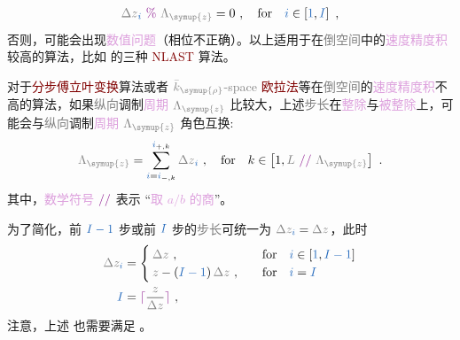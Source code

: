 \begin{align} \label{eq:iterate-mod-Tz}
	{\mathcolor{gray}{\Delta z}}_{\textcolor{NavyBlue}{i}} ~\textcolor{Plum}{\%}~ \mathcolor{gray}{\Lambda_{\symup{z}}} = 0 ~, \ \ \ \text{for} \ \ \ \textcolor{NavyBlue}{i} \in \left[ \textcolor{NavyBlue}{1}, \textcolor{NavyBlue}{I} \right] ~,
\end{align}
否则，可能会出现\textcolor{Plum}{数值问题}（相位不正确）。以上适用于在\textcolor{gray}{倒空间}中的\textcolor{Plum}{速度精度积}较高的算法，比如  的三种 \textcolor{Maroon}{NLAST} 算法。

对于\textcolor{Maroon}{分步傅立叶变换}算法或者 $\mathcolor{gray}{\bar{k}_{\symup{\rho}}}$\textcolor{gray}{-space} \textcolor{Maroon}{欧拉法}等在\textcolor{gray}{倒空间}的\textcolor{Plum}{速度精度积}不高的算法，如果\textcolor{gray}{纵向}\textcolor{NavyBlue}{调制}\textcolor{Plum}{周期} $\mathcolor{gray}{\Lambda_{\symup{z}}}$ 比较大，上述\textcolor{gray}{步长}在\textcolor{Plum}{整除}与\textcolor{Plum}{被整除}上，可能会与\textcolor{gray}{纵向}\textcolor{NavyBlue}{调制}\textcolor{Plum}{周期} $\mathcolor{gray}{\Lambda_{\symup{z}}}$ 角色互换:
\begin{align} \label{eq:iterate-Tz-mod}
	\mathcolor{gray}{\Lambda_{\symup{z}}} = \sum^{\textcolor{NavyBlue}{i}_{+,k}}_{\textcolor{NavyBlue}{i}=\textcolor{NavyBlue}{i}_{-,k}} {\mathcolor{gray}{\Delta z}}_{\textcolor{NavyBlue}{i}} ~, \ \ \ \text{for} \ \ \ k \in \left[ 1, \mathcolor{gray}{L} ~\textcolor{Plum}{//}~ \mathcolor{gray}{\Lambda_{\symup{z}}} \right] ~.
\end{align}
其中，\textcolor{Plum}{数学符号} $\textcolor{Plum}{//}$ 表示 “\textcolor{Plum}{取 $a/b$ 的商}”。

为了简化，前 $\textcolor{NavyBlue}{I-1}$ 步或前 $\textcolor{NavyBlue}{I}$ 步的\textcolor{gray}{步长}可统一为 $\mathcolor{gray}{\Delta z}_{\textcolor{NavyBlue}{i}} = \mathcolor{gray}{\Delta z}$，此时
\begin{subequations} \label{eq:iterate-step}
	\begin{align}
		\mathcolor{gray}{\Delta z}_{\textcolor{NavyBlue}{i}} &= \begin{cases}
			\mathcolor{gray}{\Delta z} ~, &\quad \text{for} \ \ \ \textcolor{NavyBlue}{i} \in \left[ \textcolor{NavyBlue}{1}, \textcolor{NavyBlue}{I-1} \right]\\
			\mathcolor{gray}{z} - \left( \textcolor{NavyBlue}{I-1} \right) \mathcolor{gray}{\Delta z} ~, &\quad \text{for} \ \ \ \textcolor{NavyBlue}{i} = \textcolor{NavyBlue}{I} \\
		\end{cases} \label{eq:iterate-step-a} \\ \textcolor{NavyBlue}{I} &= \textcolor{Plum}{\lceil \textcolor{black}{\frac{\mathcolor{gray}{z}}{\mathcolor{gray}{\Delta z}}} \rceil} \label{eq:iterate-step-b} ~,
	\end{align}
\end{subequations}
注意，上述  也需要满足 。


